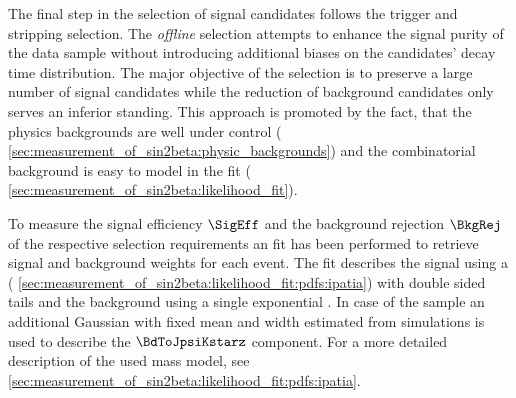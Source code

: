 The final step in the selection of signal candidates follows the trigger and
stripping selection. The \emph{offline} selection attempts to enhance the
signal purity of the data sample without introducing additional biases on the
\Bd candidates' decay time distribution. The major objective of the selection is
to preserve a large number of signal candidates while the reduction of
background candidates only serves an inferior standing. This approach is
promoted by the fact, that the physics backgrounds are well under control (\cf
\cref{sec:measurement_of_sin2beta:physic_backgrounds}) and the combinatorial
background is easy to model in the fit (\cf
\cref{sec:measurement_of_sin2beta:likelihood_fit}).

To measure the signal efficiency $\SigEff$ and the background rejection
$\BkgRej$ of the respective selection requirements an \sPlot fit
\cite{Pivk:2004ty} has been performed to retrieve signal and background weights
for each event. The fit describes the signal using a \Ipatia \PDF (\cf
\cref{sec:measurement_of_sin2beta:likelihood_fit:pdfs:ipatia}) with double sided
tails and the background using a single exponential \PDF. In case of the \catLL
sample an additional Gaussian \PDF with fixed mean and width estimated from \MC
simulations is used to describe the $\BdToJpsiKstarz$ component. For a more
detailed description of the used mass model, see
\cref{sec:measurement_of_sin2beta:likelihood_fit:pdfs:ipatia}.


